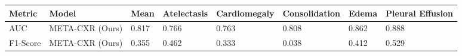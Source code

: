\begin{tabular}{llllllll}
\hline
Metric & Model & Mean & Atelectasis & Cardiomegaly & Consolidation & Edema & Pleural Effusion \\
\hline
AUC & META-CXR (Ours) & 0.817 & 0.766 & 0.763 & 0.808 & 0.862 & 0.888 \\
F1-Score & META-CXR (Ours) & 0.355 & 0.462 & 0.333 & 0.038 & 0.412 & 0.529 \\
\hline
\end{tabular}
